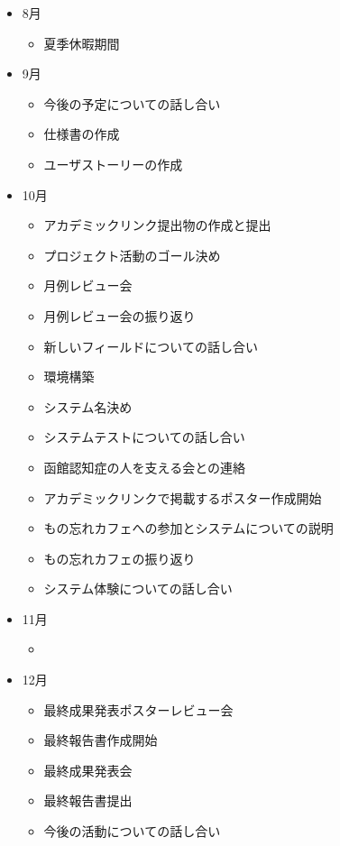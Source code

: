 \documentclass[../report]{subfiles}
\begin{document}
\begin{itemize}
\begin{itemize}
    \end{itemize}
  \item[] 8月
    \begin{itemize}
      \item 夏季休暇期間
    \end{itemize}
  \item[] 9月
    \begin{itemize}
      \item 今後の予定についての話し合い
      \item 仕様書の作成
      \item ユーザストーリーの作成
    \end{itemize}
  \item[] 10月
    \begin{itemize}
      \item アカデミックリンク提出物の作成と提出
      \item プロジェクト活動のゴール決め
      \item 月例レビュー会
      \item 月例レビュー会の振り返り
      \item 新しいフィールドについての話し合い
      \item 環境構築
      \item システム名決め
      \item システムテストについての話し合い
      \item 函館認知症の人を支える会との連絡
      \item アカデミックリンクで掲載するポスター作成開始
      \item もの忘れカフェへの参加とシステムについての説明
      \item もの忘れカフェの振り返り
      \item システム体験についての話し合い
    \end{itemize}
  \item[] 11月
    \begin{itemize}
      \item
    \end{itemize}
  \item[] 12月
    \begin{itemize}
      \item 最終成果発表ポスターレビュー会
      \item 最終報告書作成開始
      \item 最終成果発表会
      \item 最終報告書提出
      \item 今後の活動についての話し合い
    \end{itemize}
\end{itemize}
\end{document}
